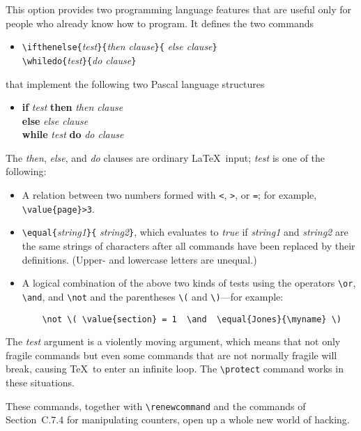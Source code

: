 This option provides two programming language features that are useful
only for people who already know how to program.  It defines the
two commands
\begin{itemize} 
\item[]
\verb|\ifthenelse{|{\em test\/}\verb|}{|{\em then clause\/}\verb|}{|%
{\em else clause\/}\verb|}|\\
\verb|\whiledo{|{\em test\/}\verb|}{|{\em do clause\/}\verb|}|
\end{itemize}
that implement the following two Pascal language structures
\begin{itemize}
\item[]
\begin{tabbing}
{\bf if} {\em test\/} \= {\bf then} \= {\em then clause\/} \\
 \> {\bf else} \> {\em else clause\/} \\[2pt]
{\bf while} {\em test\/} {\bf do} {\em do clause\/}
\end{tabbing}
\end{itemize}
The {\em then\/}, {\em else\/}, and {\em do\/} clauses
are ordinary \LaTeX\ input; {\em test\/} is one of the following:
\begin{itemize}
 \item A relation between two numbers formed with {\tt <}, {\tt >},
or {\tt =}; for example, \hbox{\verb|\value{page}>3|}.
 \item \verb|\equal{|{\em string1\/}\verb|}{|%
{\em string2\/}\verb|}|, which evaluates to {\em true\/} if {\em
string1\/} and {\em string2\/} are the same strings of characters after
all commands have been replaced by their definitions.  (Upper- and
lowercase letters are unequal.)
 \item A logical combination of the above two kinds of tests
    using the operators \hbox{\verb|\or|}, \hbox{\verb|\and|},
    and \hbox{\verb|\not|} and the parentheses \hbox{\verb|\(|}
    and \hbox{\verb|\)|}---for example:
\begin{verbatim}
    \not \( \value{section} = 1  \and  \equal{Jones}{\myname} \)
\end{verbatim}
\end{itemize}
The {\em test\/} argument is a violently moving argument, which means
that not only fragile commands but even some commands that are not
normally fragile will break, causing \TeX\ to enter an infinite loop.
The \verb|\protect| command works in these situations.

These commands, together with \hbox{\verb|\renewcommand|} and the
commands of Section~C.7.4 for manipulating counters, open up a whole
new world of hacking.


